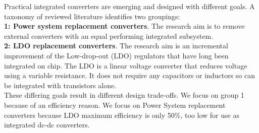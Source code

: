 \documentclass[letterpaper,twocolumn,10pt]{article}
\begin{document}
Practical integrated converters are emerging and designed with different goals. A taxonomy of reviewed literature identifies two groupings:\\
\textbf{1: Power system replacement converters}. The research aim is to remove external converters with an equal performing integrated subsystem.\\
\textbf{2: LDO replacement converters}. The research aim is an incremental improvement of the Low-drop-out (LDO) regulators that have long been integrated on chip. The LDO is a linear voltage converter that reduces voltage using a variable resistance. It does not require any capacitors or inductors so can be integrated with transistors alone.\\
These differing goals result in different design trade-offs. We focus on group 1 because of an efficiency reason. %
We focus on Power System replacement converters because LDO maximum efficiency is only 50\%, too low for use as integrated dc-dc converters. %

\end{document}
